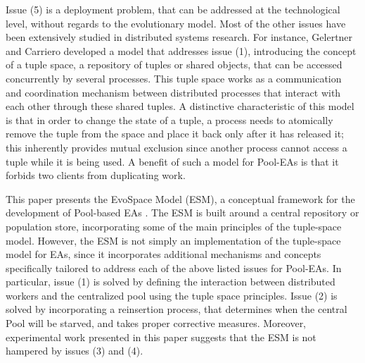 Issue (5) is a deployment problem, that can be addressed at the technological level, without regards to the evolutionary model.
Most of the other issues have been extensively studied in distributed systems research.
For instance, Gelertner and Carriero \cite{linda} developed a model that addresses issue (1), introducing the concept of a tuple space, a repository of tuples or shared objects, that can be accessed concurrently by several processes. This tuple space works as a communication and coordination mechanism between distributed processes that interact with each other through these shared tuples. A distinctive characteristic of this model is that in order to change the state of a tuple, a process needs to atomically remove the tuple from the space and place it back only after it has released it; this inherently provides mutual exclusion since another process cannot access a tuple while it is being used. A benefit of such a model for Pool-EAs is that it forbids two clients from duplicating work. 

This paper presents the EvoSpace Model (ESM), a conceptual framework for the development of Pool-based EAs \cite{Evospace}.
The ESM is built around a central repository or population store, incorporating some of the main principles of the tuple-space model.
However, the ESM is not simply an implementation of the tuple-space model for EAs,
since it incorporates additional mechanisms and concepts specifically tailored to address each of the above listed issues for Pool-EAs.
In particular, issue (1) is solved by defining the interaction between distributed workers and the centralized pool using the tuple space principles.
Issue (2) is solved by incorporating a reinsertion process, that determines when the central Pool will be starved, and takes proper corrective measures.
Moreover, experimental work presented in this paper suggests that the ESM is not hampered by issues (3) and (4).



